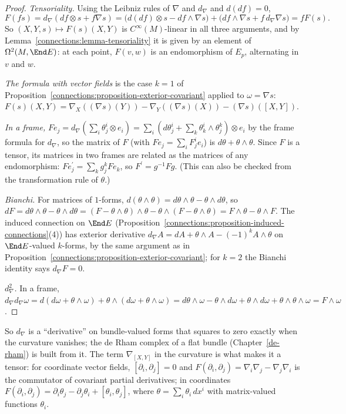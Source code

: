 \begin{proof}
\emph{Tensoriality.} Using the Leibniz rules of $\nabla$ and $d_\nabla$ and $d(df) = 0$,
\[
F(fs) = d_\nabla(df \otimes s + f\nabla s) = \bigl(d(df) \otimes s - df \wedge \nabla s\bigr) + \bigl(df \wedge \nabla s + f\,d_\nabla\nabla s\bigr) = fF(s).
\]
So $(X, Y, s) \mapsto F(s)(X, Y)$ is $C^\infty(M)$-linear in all three arguments, and by Lemma~\ref{connections:lemma-tensoriality} it is given by an element of
$\Omega^2(M, \End E)$: at each point, $F(v, w)$ is an endomorphism of $E_p$, alternating in $v$ and $w$.

\emph{The formula with vector fields} is the case $k = 1$ of Proposition~\ref{connections:proposition-exterior-covariant} applied to $\omega = \nabla s$:
$F(s)(X, Y) = \nabla_X((\nabla s)(Y)) - \nabla_Y((\nabla s)(X)) - (\nabla s)([X, Y])$.

\emph{In a frame,} $Fe_j = d_\nabla(\sum_i\theta^i_j \otimes e_i) = \sum_i(d\theta^i_j + \sum_k\theta^i_k \wedge \theta^k_j) \otimes e_i$ by the frame formula for $d_\nabla$, so the matrix of $F$
(with $Fe_j = \sum_iF^i_je_i$) is $d\theta + \theta \wedge \theta$. Since $F$ is a tensor, its matrices in two frames are related as the matrices of any endomorphism:
$Fe^{\prime}_j = \sum_kg^k_jFe_k$, so $F^{\prime} = g^{-1}Fg$. (This can also be checked from the transformation rule of $\theta$.)

\emph{Bianchi.} For matrices of $1$-forms, $d(\theta \wedge \theta) = d\theta \wedge \theta - \theta \wedge d\theta$, so
$dF = d\theta \wedge \theta - \theta \wedge d\theta = (F - \theta \wedge \theta) \wedge \theta - \theta \wedge (F - \theta \wedge \theta) = F \wedge \theta - \theta \wedge F$. The induced
connection on $\End E$ (Proposition~\ref{connections:proposition-induced-connections}(4)) has exterior derivative $d_\nabla A = dA + \theta \wedge A - (-1)^kA \wedge \theta$ on
$\End E$-valued $k$-forms, by the same argument as in Proposition~\ref{connections:proposition-exterior-covariant}; for $k = 2$ the Bianchi identity says $d_\nabla F = 0$.

\emph{$d_\nabla^2$.} In a frame, $d_\nabla d_\nabla\omega = d(d\omega + \theta \wedge \omega) + \theta \wedge (d\omega + \theta \wedge \omega) = d\theta \wedge \omega - \theta \wedge d\omega + \theta \wedge d\omega
+ \theta \wedge \theta \wedge \omega = F \wedge \omega$.
\end{proof}

So $d_\nabla$ is a ``derivative'' on bundle-valued forms that squares to zero exactly when the curvature vanishes; the de Rham complex of a flat bundle (Chapter~\ref{de-rham})
is built from it. The term $\nabla_{[X, Y]}$ in the curvature is what makes it a tensor: for coordinate vector fields, $[\partial_i, \partial_j] = 0$ and
$F(\partial_i, \partial_j) = \nabla_i\nabla_j - \nabla_j\nabla_i$ is the commutator of covariant partial derivatives; in coordinates
$F(\partial_i, \partial_j) = \partial_i\theta_j - \partial_j\theta_i + [\theta_i, \theta_j]$, where $\theta = \sum_i\theta_i\,dx^i$ with matrix-valued functions $\theta_i$.

